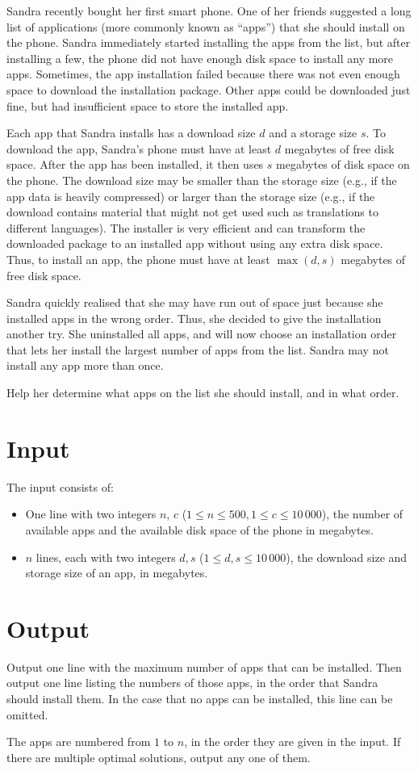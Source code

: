 
%
%
Sandra recently bought her first smart phone.
One of her friends suggested a long list of applications (more commonly known as ``apps'') that she should install on the phone.
Sandra immediately started installing the apps from the list, but after installing a few, the phone did not have enough disk space to install any more apps.
Sometimes, the app installation failed because there was not even enough space to download the installation package.
Other apps could be downloaded just fine, but had insufficient space to store the installed app.

Each app that Sandra installs has a download size $d$ and a storage size $s$.
To download the app, Sandra's phone must have at least $d$ megabytes of free disk space.
After the app has been installed, it then uses $s$ megabytes of disk space on the phone.
The download size may be smaller than the storage size (e.g., if the app data is heavily compressed) or larger than the storage size (e.g., if the download contains material that might not get used such as translations to different languages).
The installer is very efficient and can transform the downloaded package to an installed app without using any extra disk space.
Thus, to install an app, the phone must have at least $\max(d, s)$ megabytes of free disk space.

Sandra quickly realised that she may have run out of space just because she installed apps in the wrong order.
Thus, she decided to give the installation another try.
She uninstalled all apps, and will now choose an installation order that lets her install the largest number of apps from the list.
Sandra may not install any app more than once.

Help her determine what apps on the list she should install, and in what order.

\section*{Input}
The input consists of:
\begin{itemize}
\item One line with two integers $n$, $c$ ($1 \le n \le 500, 1 \le c \le 10\,000$), the number of
  available apps and the available disk space of the phone in megabytes.
\item $n$ lines, each with two integers $d, s$ ($1 \le d, s \le 10\,000$), the download size and storage size of an app, in megabytes.
\end{itemize}


\section*{Output}
Output one line with the maximum number of apps that can be installed.
Then output one line listing the numbers of those apps, in the order that Sandra should install them.
In the case that no apps can be installed, this line can be omitted.

The apps are numbered from $1$ to $n$, in the order they are given in the input.
If there are multiple optimal solutions, output any one of them.
